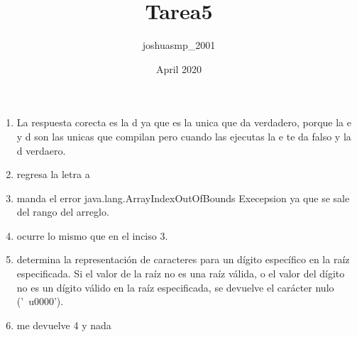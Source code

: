 \documentclass{article}
\title{Tarea5}
\author{joshuasmp_2001 }
\date{April 2020}
\begin{document}
\begin{enumerate}
\item La respuesta corecta es la d ya que es la unica que da verdadero, porque la e y d son las unicas que compilan pero cuando las ejecutas la e te da falso y la d verdaero.
\item regresa la letra a 
\item manda el error java.lang.ArrayIndexOutOfBounds Execepsion  ya que se sale del rango del arreglo.
\item ocurre lo mismo que en el inciso 3.
\item determina la representación de caracteres para un dígito específico en la raíz especificada. Si el valor de la raíz no es una raíz válida, o el valor del dígito no es un dígito válido en la raíz especificada, se devuelve el carácter nulo ('\ u0000').
\item me devuelve 4 y nada 
\end{enumerate}
\end{document}
